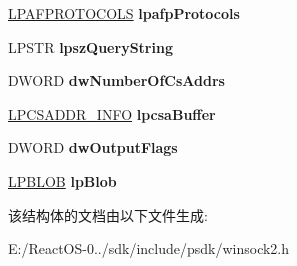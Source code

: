 \begin{DoxyCompactItemize}
\item 
\mbox{\label{struct___w_s_a_query_set2_a_abd99f68c356a642d0a8a70b59aa4ada6}} 
\hyperlink{struct___a_f_p_r_o_t_o_c_o_l_s}{L\+P\+A\+F\+P\+R\+O\+T\+O\+C\+O\+LS} {\bfseries lpafp\+Protocols}
\item 
\mbox{\label{struct___w_s_a_query_set2_a_aaf875fae7d9c69280e346b46f0f08df5}} 
L\+P\+S\+TR {\bfseries lpsz\+Query\+String}
\item 
\mbox{\label{struct___w_s_a_query_set2_a_af8119d23f9001a92b8ee5fd3cb19cfb1}} 
D\+W\+O\+RD {\bfseries dw\+Number\+Of\+Cs\+Addrs}
\item 
\mbox{\label{struct___w_s_a_query_set2_a_ac3424ce612c7dd16a1411d6fd8a02665}} 
\hyperlink{struct___c_s_a_d_d_r___i_n_f_o}{L\+P\+C\+S\+A\+D\+D\+R\+\_\+\+I\+N\+FO} {\bfseries lpcsa\+Buffer}
\item 
\mbox{\label{struct___w_s_a_query_set2_a_aa89791b19332b120e3782b4e7d877f1d}} 
D\+W\+O\+RD {\bfseries dw\+Output\+Flags}
\item 
\mbox{\label{struct___w_s_a_query_set2_a_a12a598b5d4a4fdef0a3699a0510131e3}} 
\hyperlink{struct___b_l_o_b}{L\+P\+B\+L\+OB} {\bfseries lp\+Blob}
\end{DoxyCompactItemize}


该结构体的文档由以下文件生成\+:\begin{DoxyCompactItemize}
\item 
E\+:/\+React\+O\+S-\/0../sdk/include/psdk/winsock2.\+h\end{DoxyCompactItemize}
